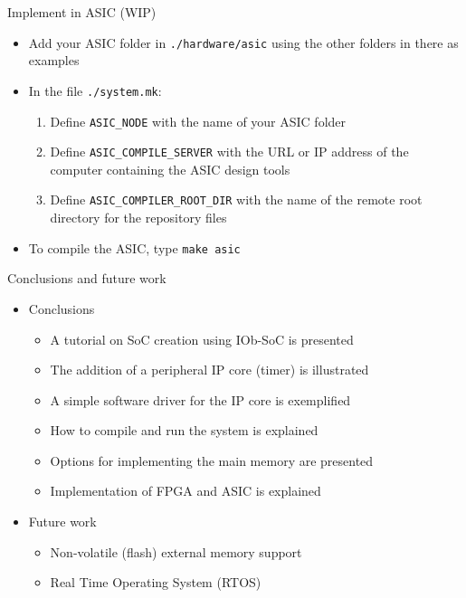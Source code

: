 \documentclass [xcolor=svgnames, t] {beamer}
\begin{document}
\begin{frame}{Implement in ASIC (WIP)}
\begin{itemize}
  \item Add your ASIC folder in {\tt ./hardware/asic} using the other folders in there as examples
  \item In the file {\tt ./system.mk}:
  \begin{enumerate}
     \item Define {\tt ASIC\_NODE} with the name of your ASIC folder
     \item Define {\tt ASIC\_COMPILE\_SERVER} with the URL or IP address of the computer containing the ASIC design tools
     \item Define {\tt ASIC\_COMPILER\_ROOT\_DIR} with the name of the remote root directory for the repository files
  \end{enumerate}
  \item To compile the ASIC, type {\tt make asic}
\end{itemize}
\end{frame}


\begin{frame}{Conclusions and future work}

\begin{itemize}
  \item Conclusions
    \begin{itemize}
    \item A tutorial on SoC creation using IOb-SoC is presented
    \item The addition of a peripheral IP core (timer) is illustrated
    \item A simple software driver for the IP core is exemplified
    \item How to compile and run the system is explained 
    \item Options for implementing the main memory are presented
    \item Implementation of FPGA and ASIC is explained
    \end{itemize}
  \item Future work
    \begin{itemize}
    \item Non-volatile (flash) external memory support
    \item Real Time Operating System (RTOS) 
    \end{itemize}
\end{itemize}

\end{frame}

\end{document}
